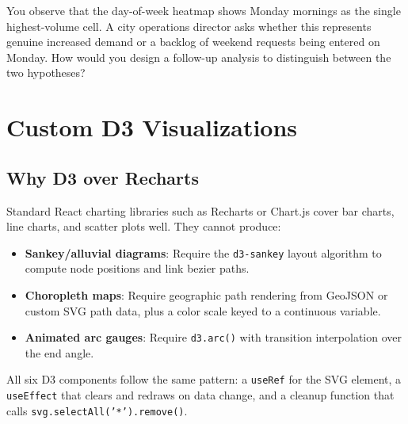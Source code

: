 \begin{interviewbox}
You observe that the day-of-week heatmap shows Monday mornings as the single highest-volume cell. A city operations director asks whether this represents genuine increased demand or a backlog of weekend requests being entered on Monday. How would you design a follow-up analysis to distinguish between the two hypotheses?
\end{interviewbox}

\section{Custom D3 Visualizations}
\label{sec:ops-d3}


\subsection{Why D3 over Recharts}

Standard React charting libraries such as Recharts or Chart.js cover bar charts, line charts, and scatter plots well. They cannot produce:

\begin{itemize}
  \item \textbf{Sankey/alluvial diagrams}: Require the \texttt{d3-sankey} layout algorithm to compute node positions and link bezier paths.
  \item \textbf{Choropleth maps}: Require geographic path rendering from GeoJSON or custom SVG path data, plus a color scale keyed to a continuous variable.
  \item \textbf{Animated arc gauges}: Require \texttt{d3.arc()} with transition interpolation over the end angle.
\end{itemize}

All six D3 components follow the same pattern: a \texttt{useRef} for the SVG element, a \texttt{useEffect} that clears and redraws on data change, and a cleanup function that calls \texttt{svg.selectAll('*').remove()}.

